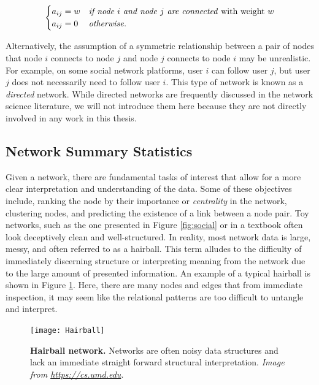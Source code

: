\[ \begin{cases} 
     a_{ij}=w & \text{\emph{if node $i$ and node $j$ are connected} with weight $w$} \\
      a_{ij}=0 & \text{\emph{otherwise}}.
         \end{cases}
\]

Alternatively, the assumption of a symmetric relationship between a pair of nodes that node $i$ connects to node $j$ and node $j$ connects to node $i$  may be unrealistic. For example, on some social network platforms, user $i$ can follow user $j$, but user $j$ does not necessarily need to follow user $i$. This type of network is known as a \emph{directed} network. While directed networks are frequently discussed in the network science literature, we will not introduce them here because they are not directly involved in any work in this thesis. 

\subsection{Network Summary Statistics}

\indent Given a network, there are fundamental tasks of interest that allow for a more clear interpretation and understanding of the data. Some of these objectives include, ranking the node by their importance or \emph{centrality} in the network, clustering nodes, and predicting the existence of a link between a node pair. Toy networks, such as the one presented in Figure \ref{fig:social} or in a textbook often look deceptively clean and well-structured. In reality, most network data is large, messy, and often referred to as a hairball. This term alludes to the difficulty of immediately discerning structure or interpreting meaning from the network due to the large amount of presented information. An example of a typical hairball is shown in Figure \ref{fig:Hairball}. Here, there are many nodes and edges that from immediate inspection, it may seem like the relational patterns are too difficult to untangle and interpret.

\begin{figure}
\begin{center}
\texttt{[image: Hairball]}
\caption{{\bf Hairball network.} Networks are often noisy data structures and lack an immediate straight forward structural interpretation. \emph{Image from \url{https://cs.umd.edu}.}}
\label{fig:Hairball}
\end{center}
\end{figure}

